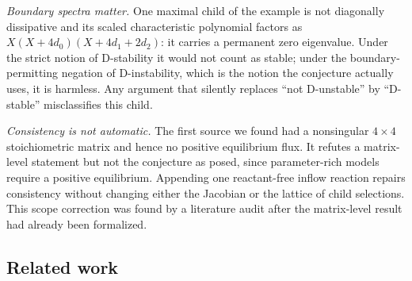 \documentclass[11pt,a4paper]{article}
\theoremstyle{definition}
\theoremstyle{remark}
\begin{document}
\emph{Boundary spectra matter.} One maximal child of the example is not diagonally dissipative and its scaled characteristic polynomial factors as $X(X+4d_0)(X+4d_1+2d_2)$: it carries a permanent zero eigenvalue. Under the strict notion of D-stability it would not count as stable; under the boundary-permitting negation of D-instability, which is the notion the conjecture actually uses, it is harmless. Any argument that silently replaces ``not D-unstable'' by ``D-stable'' misclassifies this child.

\emph{Consistency is not automatic.} The first source we found had a nonsingular $4\times4$ stoichiometric matrix and hence no positive equilibrium flux. It refutes a matrix-level statement but not the conjecture as posed, since parameter-rich models require a positive equilibrium. Appending one reactant-free inflow reaction repairs consistency without changing either the Jacobian or the lattice of child selections. This scope correction was found by a literature audit after the matrix-level result had already been formalized.

\subsection*{Related work}
\end{document}

